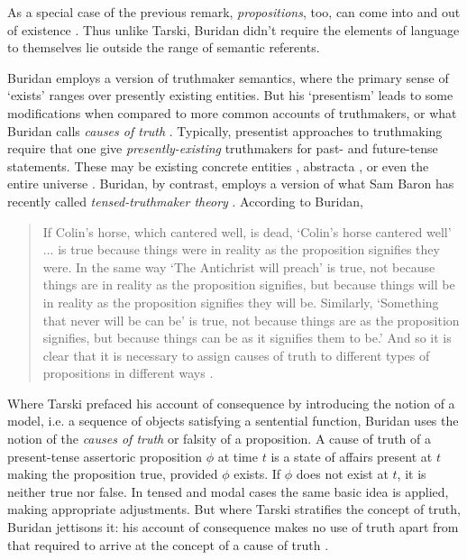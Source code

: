 \documentclass[]{article}
\begin{document}
As a special case of the previous remark, \textit{propositions}, too, can come into and out of existence \cite{Klima2004} \cite{DutilhNovaes2005}. Thus unlike Tarski, Buridan didn't require the elements of language to themselves lie outside the range of semantic referents.

Buridan employs a version of truthmaker semantics, where the primary sense of `exists' ranges over presently existing entities. But his `presentism' leads to some modifications when compared to more common accounts of truthmakers, or what Buridan calls \textit{causes of truth} \cite[TC I.1]{Buridan2015}. Typically, presentist approaches to truthmaking require that one give \textit{presently-existing} truthmakers for past- and future-tense statements. These may be existing concrete entities \cite{Cameron2008} \cite{Cameron2011} \cite{Cameron2013}, abstracta \cite{Crisp2007}, or even the entire universe \cite{Bigelow1996}. Buridan, by contrast, employs a version of what Sam Baron has recently called \textit{tensed-truthmaker theory} \cite{Baron2015}. According to Buridan,
\begin{quote}
If Colin's horse, which cantered well, is dead, `Colin's horse cantered well' ... is true because things were in reality as the proposition signifies they were. In the same way `The Antichrist will preach' is true, not because things are in reality as the proposition signifies, but because things will be in reality as the proposition signifies they will be. Similarly, `Something that never will be can be' is true, not because things are as the proposition signifies, but because things can be as it signifies them to be.' And so it is clear that it is necessary to assign causes of truth to different types of propositions in different ways \cite[TC I. 1, 63]{Buridan2015}.
\end{quote}

Where Tarski prefaced his account of consequence by introducing the notion of a model, i.e. a sequence of objects satisfying a sentential function, Buridan uses the notion of the \textit{causes of truth} or falsity of a proposition. A cause of truth of a present-tense assertoric proposition $\phi$ at time $t$ is a state of affairs present at $t$ making the proposition true, provided $\phi$ exists. If $\phi$ does not exist at $t$, it is neither true nor false. In tensed and modal cases the same basic idea is applied, making appropriate adjustments. But where Tarski stratifies the concept of truth, Buridan jettisons it: his account of consequence makes no use of truth apart from that required to arrive at the concept of a cause of truth \cite{Klima2008}.
\end{document}
